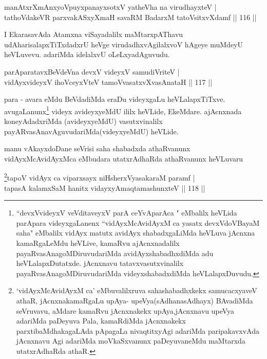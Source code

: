 \begin{shl}
manAtxrXmAnxyoV\s puyxpanayxsotxV yatheVha na virudhayxteV |\\
tathoVdakeVR parxvakASxyXmaH savaRM BadarxM tatoV\s sitxvXdamf \hfill || 116 ||
\end{shl}

\begin{artha}
I EkarasavAda Atamxna viSayadalilx maMtarxpAThavu udAharisalapxTiTxdadxrU heVge virudadhxvAgilalxvoV hAgeye muMdeyU heVLuvevu. adariMda idelalxvU oLeLxyadAguvudu.
\end{artha}

\begin{shl}
parAparatavxBeVdeVna devxV videyxV samudiVriteV |\\
vidAyxvideyxV ihoVceyxVteV tamoVvasatxvXvasAnataH \hfill || 117 ||
\end{shl}

\begin{artha}
para - avara eMdu BeVdadiMda eraDu videyxgaLu heVLalapxTiTxve.  avugaLanunx\footnote{``devxVvideyxV veVditaveyxV parA ceYvAparAca " eMbalilx heVLida parApara videyxgaLanenx ``vidAyxMcAvidAyxM ca yasatx devxVdoVBayaM saha" eMbalilx vidAyx matutx avidAyx shabadxgaLiMda heVLuva jAcnxna kamaRgaLeMdu heVLive, kamaRvu ajAcnxnadalilx payaRvasAnagoMDiruvudariMda avidAyxshabadhxdiMda adu heVLalapxDutatxde. jAcnxnavu tatavxvasutxvinalilx payaRvasAnagoMDiruvudariMda videyxshabadxdiMda heVLalapxDuvudu.} videyx avideyxyeMdU ililx heVLide, EkeMdare. ajAcnxnada koneyAdadxriMda (avideyxyeMdU) vasutxvinalilx payARvasAnavAguvudariMda(videyxyeMdU) heVLide.
\end{artha}


\begin{artha}
manu vAkayxdoDane seVrisi saha shabadxda athaRvanunx vidAyxMcAvidAyxMca eMbudara utatxrAdhaRda athaRvanunx heVLuvaru
\end{artha}


\begin{shl}
\footnote{`vidAyxMcAvidAyxM ca' eMbuvalilxruva sahashabadhxkekx samucacxyaveV athaR, jAcnxnakamaRgaLu upAya- upeVya(sAdhanasAdhayx) BAvadiMda seVruvavu, aMdare kamaRvu jAcnxnakekx upAya,jAcnxnavu upeVya adariMda paDeyuva Pala, kamaRdiMda jAcnxnakekx   parxtibaMdhakagaLAda pApagaLa nivaqtitxyAgi adariMda paripakavxvAda jAcnxnavu Agi adariMda moVkaSxvanunx paDeyuvaneMdu maMtarxda utatxrAdhaRda athaR.}tapoV vidAyx ca viparxsayx niHsherxVyasakaraM paramf |\\
tapasA kalamxSaM hanitx vidayxyA\s maqtamashunxteV \hfill || 118 ||
\end{shl}


